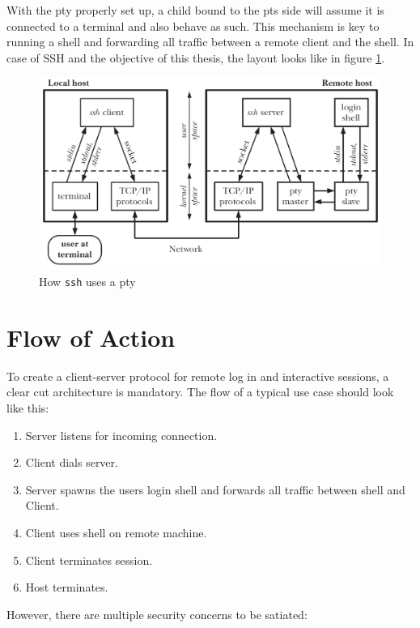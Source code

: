 \documentclass[10pt,a4paper,titlepage,twoside,english,final]{zhawreprt}
\begin{document}
With the \gls{pty} properly set up, a child bound to the \gls{pts} side will assume it is connected to a \gls{terminal} and also behave as such. This mechanism is key to running a \gls{shell} and forwarding all traffic between a remote client and the \gls{shell}. In case of \gls{SSH} and the objective of this thesis, the layout looks like in figure \ref{fig:HowSSHUsesPty}.
\begin{figure}[ht]
\includegraphics[width=\textwidth]{PseudoterminalSSH}
\caption{How \texttt{ssh} uses a \gls{pty}\citep[p.1378]{KerriskTLPI}}
\label{fig:HowSSHUsesPty}
\end{figure}

\newpage
\section{Flow of Action}\label{sec:DesignFlowOfAction}
To create a client-server protocol for remote log in and interactive sessions, a clear cut architecture is mandatory. The flow of a typical use case should look like this:

\begin{enumerate}
\item Server listens for incoming connection.
\item Client dials server.
\item Server spawns the users login \gls{shell} and forwards all traffic between \gls{shell} and Client.
\item Client uses \gls{shell} on remote machine.
\item Client terminates session.
\item Host terminates.
\end{enumerate}

However, there are multiple security concerns to be satiated:
\end{document}
